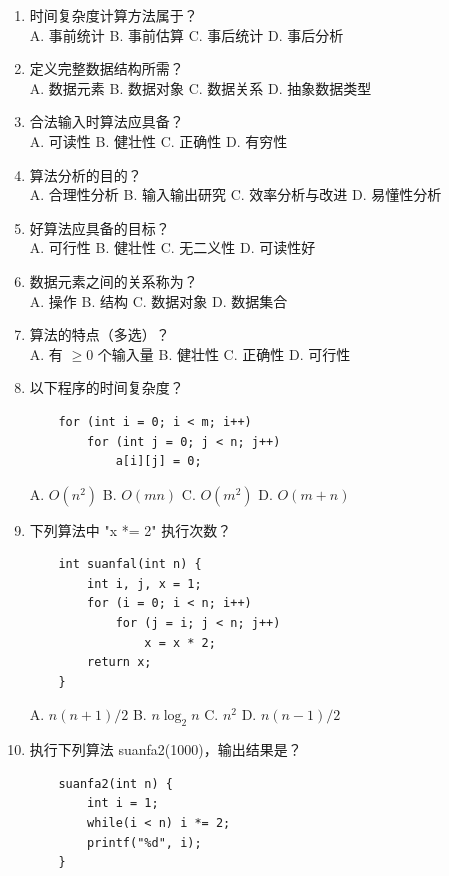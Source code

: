 \documentclass[lang=cn,newtx,10pt,scheme=chinese]{../../elegantbook}
\begin{document}
\begin{enumerate}
    \item 时间复杂度计算方法属于？\\
    A. 事前统计 \quad B. 事前估算 \quad C. 事后统计 \quad D. 事后分析

    \item 定义完整数据结构所需？\\
    A. 数据元素 \quad B. 数据对象 \quad C. 数据关系 \quad D. 抽象数据类型

    \item 合法输入时算法应具备？\\
    A. 可读性 \quad B. 健壮性 \quad C. 正确性 \quad D. 有穷性

    \item 算法分析的目的？\\
    A. 合理性分析 \quad B. 输入输出研究 \quad C. 效率分析与改进 \quad D. 易懂性分析

    \item 好算法应具备的目标？\\
    A. 可行性 \quad B. 健壮性 \quad C. 无二义性 \quad D. 可读性好

    \item 数据元素之间的关系称为？\\
    A. 操作 \quad B. 结构 \quad C. 数据对象 \quad D. 数据集合

    \item 算法的特点（多选）？\\
    A. 有 $\geq 0$ 个输入量 \quad B. 健壮性 \quad C. 正确性 \quad D. 可行性

    \item 以下程序的时间复杂度？
    \begin{verbatim}
    for (int i = 0; i < m; i++)
        for (int j = 0; j < n; j++)
            a[i][j] = 0;
    \end{verbatim}
    A. $O(n^2)$ \quad B. $O(mn)$ \quad C. $O(m^2)$ \quad D. $O(m+n)$

    \item 下列算法中 "x *= 2" 执行次数？
    \begin{verbatim}
    int suanfal(int n) {
        int i, j, x = 1;
        for (i = 0; i < n; i++)
            for (j = i; j < n; j++)
                x = x * 2;
        return x;
    }
    \end{verbatim}
    A. $n(n+1)/2$ \quad B. $n\log_2 n$ \quad C. $n^2$ \quad D. $n(n-1)/2$

    \item 执行下列算法 suanfa2(1000)，输出结果是？
    \begin{verbatim}
    suanfa2(int n) {
        int i = 1;
        while(i < n) i *= 2;
        printf("%d", i);
    }
    \end{verbatim}
    

\end{enumerate}
\end{document}
